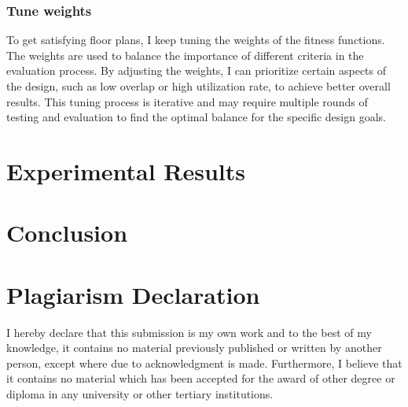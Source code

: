 \documentclass[]{article}
\begin{document}
\subsubsection{Tune weights}
To get satisfying floor plans, I keep tuning the weights of the fitness functions. The weights are used to balance the importance of different criteria in the evaluation process. By adjusting the weights, I can prioritize certain aspects of the design, such as low overlap or high utilization rate, to achieve better overall results. This tuning process is iterative and may require multiple rounds of testing and evaluation to find the optimal balance for the specific design goals.

\section{Experimental Results}


\section{Conclusion}


\section{Plagiarism Declaration}
I hereby declare that this submission is my own work and to the best of my knowledge, it contains no material previously published or written by another person, except where due to acknowledgment is made. Furthermore, I believe that it contains no material which has been accepted for the award of other degree or diploma in any university or other tertiary institutions.




\end{document}
